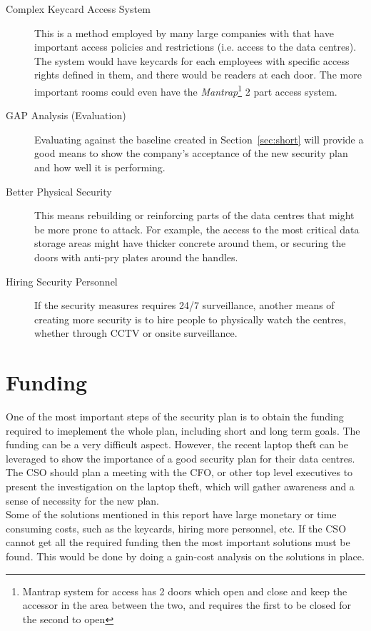 \documentclass{article}
\numberwithin{equation}{section} %
\numberwithin{figure}{section} %
\numberwithin{table}{section} %
\begin{document}
\begin{description}
	\item[Complex Keycard Access System]  This is a method employed by many large companies with that have important access policies and restrictions (i.e. access to the data centres).  The system would have keycards for each employees with specific access rights defined in them, and there would be readers at each door.  The more important rooms could even have the \textit{Mantrap}\footnote{Mantrap system for access has 2 doors which open and close and keep the accessor in the area between the two, and requires the first to be closed for the second to open} 2 part access system.
	\item[GAP Analysis (Evaluation)]  Evaluating against the baseline created in Section~\ref{sec:short} will provide a good means to show the company's acceptance of the new security plan and how well it is performing. 
	\item[Better Physical Security]  This means rebuilding or reinforcing parts of the data centres that might be more prone to attack.  For example, the access to the most critical data storage areas might have thicker concrete around them, or securing the doors with anti-pry plates around the handles.  
	\item[Hiring Security Personnel]  If the security measures requires 24/7 surveillance, another means of creating more security is to hire people to physically watch the centres, whether through CCTV or onsite surveillance. 
\end{description}

\section{Funding}
One of the most important steps of the security plan is to obtain the funding required to imeplement the whole plan, including short and long term goals. The funding can be a very difficult aspect.  However, the recent laptop theft can be leveraged to show the importance of a good security plan for their data centres.\\

The CSO should plan a meeting with the CFO, or other top level executives to present the investigation on the laptop theft, which will gather awareness and a sense of necessity for the new plan.\\

Some of the solutions mentioned in this report have large monetary or time consuming costs, such as the keycards, hiring more personnel, etc.  If the CSO cannot get all the required funding then the most important solutions must be found.  This would be done by doing a gain-cost analysis on the solutions in place.

 
\end{document}
